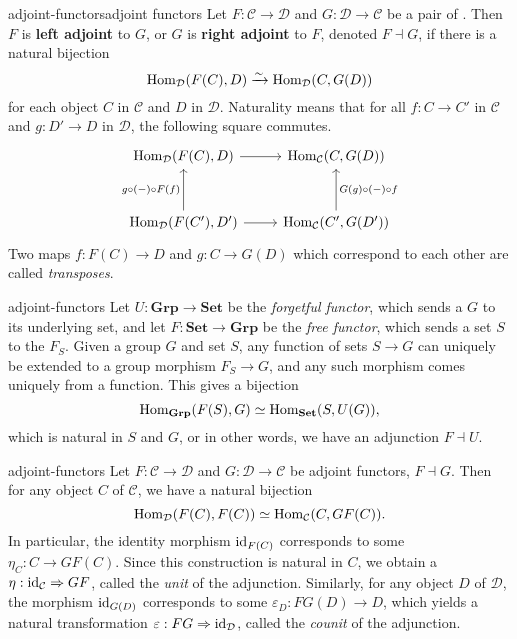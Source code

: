\begin{topic}{adjoint-functors}{adjoint functors}
    Let $F : \mathcal{C} \to \mathcal{D}$ and $G : \mathcal{D} \to \mathcal{C}$ be a pair of . Then $F$ is \textbf{left adjoint} to $G$, or $G$ is \textbf{right adjoint} to $F$, denoted $F \dashv G$, if there is a natural bijection
    \[ \text{Hom}_{\mathcal{D}}(F(C), D) \xrightarrow{\sim} \text{Hom}_{\mathcal{D}}(C, G(D)) \]
    for each object $C$ in $\mathcal{C}$ and $D$ in $\mathcal{D}$. Naturality means that for all $f : C \to C'$ in $\mathcal{C}$ and $g : D' \to D$ in $\mathcal{D}$, the following square commutes.
    \[ \begin{tikzcd}[row sep=3em] \Hom_{\mathcal{D}}(F(C), D) \arrow{r} & \Hom_{\mathcal{C}}(C, G(D)) \\ \Hom_{\mathcal{D}}(F(C'), D') \arrow{r} \arrow{u}{g \circ (-) \circ F(f)} & \Hom_{\mathcal{C}}(C', G(D')) \arrow[swap]{u}{G(g) \circ (-) \circ f} \end{tikzcd} \]
    Two maps $f : F(C) \to D$ and $g : C \to G(D)$ which correspond to each other are called \textit{transposes}.
\end{topic}

\begin{example}{adjoint-functors}
    Let $U : \textbf{Grp} \to \textbf{Set}$ be the \textit{forgetful functor}, which sends a  $G$ to its underlying set, and let $F : \textbf{Set} \to \textbf{Grp}$ be the \textit{free functor}, which sends a set $S$ to the  $F_S$. Given a group $G$ and set $S$, any function of sets $S \to G$ can uniquely be extended to a group morphism $F_S \to G$, and any such morphism comes uniquely from a function. This gives a bijection
    \[ \text{Hom}_{\textbf{Grp}}(F(S), G) \simeq \text{Hom}_{\textbf{Set}}(S, U(G)) , \]
    which is natural in $S$ and $G$, or in other words, we have an adjunction $F \dashv U$.
\end{example}

\begin{example}{adjoint-functors}
    Let $F : \mathcal{C} \to \mathcal{D}$ and $G : \mathcal{D} \to \mathcal{C}$ be adjoint functors, $F \dashv G$. Then for any object $C$ of $\mathcal{C}$, we have a natural bijection
    \[ \text{Hom}_{\mathcal{D}}(F(C), F(C)) \simeq \text{Hom}_{\mathcal{C}}(C, GF(C)) . \]
    In particular, the identity morphism $\text{id}_{F(C)}$ corresponds to some $\eta_C : C \to GF(C)$. Since this construction is natural in $C$, we obtain a  $\eta : \text{id}_\mathcal{C} \Rightarrow GF$, called the \textit{unit} of the adjunction.
    Similarly, for any object $D$ of $\mathcal{D}$, the morphism $\text{id}_{G(D)}$ corresponds to some $\varepsilon_D : FG(D) \to D$, which yields a natural transformation $\varepsilon : FG \Rightarrow \text{id}_\mathcal{D}$, called the \textit{counit} of the adjunction.
\end{example}

